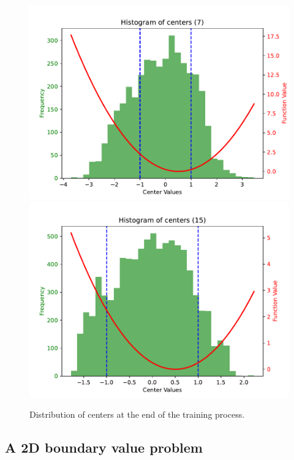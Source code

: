 \documentclass[12pt]{report} %
\begin{document}
\begin{figure}[h]
  \includegraphics[width=\textwidth]{imagenes/experiments/1d/ode/histogram-centers-C7.pdf}
  \includegraphics[width=\textwidth]{imagenes/experiments/1d/ode/histogram-centers-C15.pdf}
  \caption{Distribution of centers at the end of the training process.}
  \label{fig:ode-1d-distribution-of-centers}
\end{figure}

\clearpage

\subsection*{A 2D boundary value problem}
\end{document}
